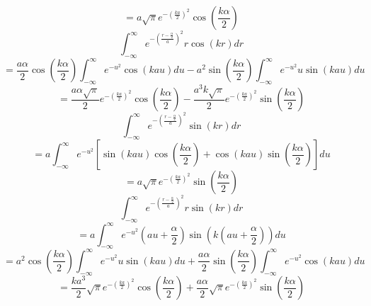\documentclass[12pt]{article}
\begin{document}
\begin{equation}{=a\sqrt{\pi}e^{-\left(\frac{ka}{2}\right)^2}\cos(\frac{k\alpha}{2})}\end{equation} 
\[{}\]
\[{}\]
\begin{equation}{\int_{-\infty}^{\infty}{e^{-\left(\frac{r-\frac{\alpha}{2}}{a}\right)^2}r\cos(kr)d{r}}}\end{equation}
\begin{equation}{=\frac{a\alpha}{2}\cos\left(\frac{k\alpha}{2}\right)\int_{-\infty}^{\infty}{e^{-u^2}\cos(kau)d{u}} -a^2\sin\left(\frac{k\alpha}{2}\right)\int_{-\infty}^{\infty}{e^{-u^2}u\sin(kau)d{u}}}\end{equation}
\begin{equation}{=\frac{a\alpha\sqrt{\pi}}{2}e^{-\left(\frac{ka}{2}\right)^2}\cos\left(\frac{k\alpha}{2}\right)-\frac{a^3k\sqrt{\pi}}{2}e^{-\left(\frac{ka}{2}\right)^2}\sin\left(\frac{k\alpha}{2}\right)}\end{equation}
\[{}\]
\begin{equation}{\int_{-\infty}^{\infty}{e^{-\left(\frac{r-\frac{\alpha}{2}}{a}\right)^2}\sin(kr)d{r}}}\end{equation} 
\begin{displaymath}{=a\int_{-\infty}^{\infty}{e^{-u^2}\left[\sin(kau)\cos(\frac{k\alpha}{2})+\cos(kau)\sin(\frac{k\alpha}{2})\right]d{u}}}\end{displaymath}  
\begin{equation}{=a\sqrt{\pi}e^{-\left(\frac{ka}{2}\right)^2}\sin(\frac{k\alpha}{2})}\end{equation} 
\[{}\]
\[{}\]
\begin{equation}{\int_{-\infty}^{\infty}{e^{-\left(\frac{r-\frac{\alpha}{2}}{a}\right)^2}r\sin(kr)d{r}}}\end{equation} 
\begin{displaymath}{=a\int_{-\infty}^{\infty}{e^{-u^2}(au+\frac{\alpha}{2})\sin(k(au+\frac{\alpha}{2}))d{u}}}\end{displaymath} 
\begin{displaymath}{=a^2\cos(\frac{k\alpha}{2})\int_{-\infty}^{\infty}{e^{-u^2}u\sin(kau)d{u} +\frac{a\alpha}{2}\sin(\frac{k\alpha}{2})\int_{-\infty}^{\infty}e^{-u^2}\cos(kau)d{u}}}\end{displaymath} 
\begin{equation}{=\frac{ka^3}{2}\sqrt{\pi}e^{-\left(\frac{ka}{2}\right)^2}\cos(\frac{k\alpha}{2})+\frac{a\alpha}{2}\sqrt{\pi}e^{-\left(\frac{ka}{2}\right)^2}\sin(\frac{k\alpha}{2})}\end{equation} 
\end{document}
